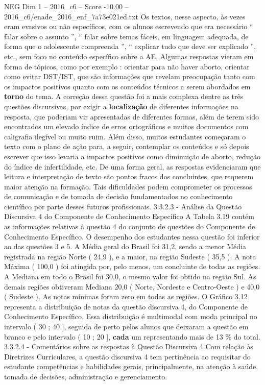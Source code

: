 \begin{textsample}{NEG Dim 1 – 2016\_c6 – Score -10.00 – 2016\_c6/enade\_2016\_enf\_7a73e021ed.txt}
Os textos, nesse aspecto, às vezes eram evasivos ou não específicos, com os alunos escrevendo que era necessário “ falar sobre o assunto ”, “ falar sobre temas fáceis, em linguagem adequada, de forma que o adolescente compreenda ”, “ explicar tudo que deve ser explicado ”, etc., sem foco no conteúdo específico sobre a AE.
Algumas respostas vieram em forma de tópicos, como por exemplo : orientar para não haver aborto, orientar como evitar DST/IST, que são informações que revelam preocupação tanto com os impactos positivos quanto com os conteúdos técnicos a serem abordados em \textbf{torno} do tema.
A correção dessa questão foi a mais complexa dentre as três questões discursivas, por exigir a \textbf{localização} de diferentes informações na resposta, que poderiam vir apresentadas de diferentes formas, além de terem sido encontrados um elevado índice de erros ortográficos e muitos documentos com caligrafia ilegível ou muito ruim.
Além disso, muitos estudantes começaram o texto com o plano de ação para, a seguir, contemplar os conteúdos e só depois escrever que isso levaria a impactos positivos como diminuição de aborto, redução do índice de infertilidade, etc.
De uma forma geral, as respostas evidenciaram que leitura e interpretação de texto são pontos fracos dos concluintes, que requerem maior atenção na formação.
Tais dificuldades podem comprometer os processos de comunicação e de tomada de decisão fundamentados no conhecimento científico por parte desses futuros profissionais. 3.3.2.3 - Análise da Questão Discursiva 4 do Componente de Conhecimento Específico A Tabela 3.19 contém as informações relativas à questão 4 do conjunto de questões do Componente de Conhecimento Específico.
O desempenho dos estudantes nessa questão foi inferior ao das questões 3 e 5.
A Média geral do Brasil foi 31,2, sendo a menor Média registrada na região Norte ( 24,9 ), e a maior, na região Sudeste ( 35,5 ).
A nota Máxima ( 100,0 ) foi atingida por, pelo menos, um concluinte de todas as regiões.
A Mediana em todo o Brasil foi 30,0, o mesmo valor foi obtido na região Sul.
As demais regiões obtiveram Mediana 20,0 ( Norte, Nordeste e Centro-Oeste ) e 40,0 ( Sudeste ).
As notas mínimas foram zero em todas as regiões.
O Gráfico 3.12 representa a distribuição de notas da questão discursiva 4, do Componente de Conhecimento Específico.
Essa distribuição é multimodal com moda principal no intervalo ( 30 ; 40 ], seguida de perto pelos alunos que deixaram a questão em branco e pelo intervalo ( 10 ; 20 ], \textbf{cada} um representando mais de 13 \% do total. 3.3.2.4 - Comentários sobre as respostas à Questão Discursiva 4 Com relação às Diretrizes Curriculares, a questão discursiva 4 tem pertinência ao requisitar do estudante competências e habilidades gerais, principalmente, na atenção à saúde, tomada de decisões, administração e gerenciamento.

\end{textsample}
